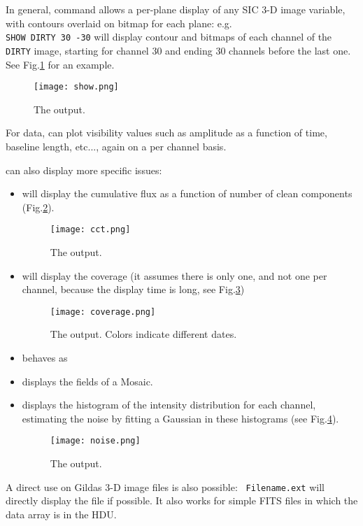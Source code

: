 In general, command  allows a per-plane display of any SIC 
3-D image variable, with contours overlaid on bitmap for each plane: 
e.g.\\
\texttt{SHOW DIRTY 30 -30} 
will display contour and bitmaps of each channel of the \texttt{DIRTY}
image, starting for channel 30 and ending 30 channels before the last one.
See Fig.\ref{fig:show} for an example. 
\begin{figure}
  \centering
  \texttt{[image: show.png]}
  \caption{The  output.
\label{fig:show}}
\end{figure}

For \uv{}  data,  can plot visibility values
such as amplitude as a function of time, baseline length, etc...,
again on a per channel basis. 

 can also display more specific issues:
\begin{itemize}\itemsep 0pt
\item {} will display the cumulative flux as a function 
of number of clean components (Fig.\ref{fig:cct}). 
\begin{figure}
  \centering
  \texttt{[image: cct.png]}
  \caption{The  output.
\label{fig:cct}}
\end{figure}
\item {} will display the \uv{} coverage (it
assumes there is only one, and not one per channel, because the
display time is long, see Fig.\ref{fig:coverage})
\begin{figure}
  \centering
  \texttt{[image: coverage.png]}
  \caption{The  output. Colors indicate
  different dates.
\label{fig:coverage}}
\end{figure}
\item {} behaves as 
\item {} displays the fields of a Mosaic.
\item {} displays the histogram of the intensity
distribution for each channel, estimating the noise by fitting
a Gaussian in these histograms (see Fig.\ref{fig:noise}).
\begin{figure}
  \centering
  \texttt{[image: noise.png]}
  \caption{The  output.
\label{fig:noise}}
\end{figure}
\end{itemize}

A direct use on Gildas 3-D image files is also possible:
\texttt{ Filename.ext} will directly display the
file if possible. It also works for simple FITS files in which
the data array is in the HDU.

